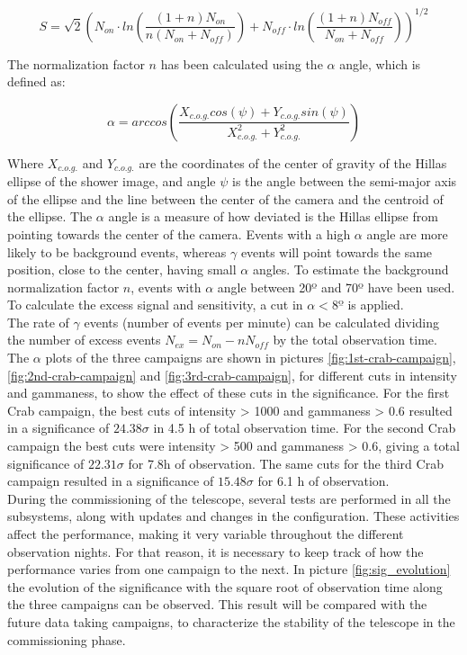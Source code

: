 \documentclass[main.tex]{subfiles}
\begin{document}
\begin{equation}
  S = \sqrt{2} \left(N_{on}\cdot ln\left( \frac{(1+n)N_{on}}{n(N_{on}+N_{off})}\right)+N_{off}\cdot ln\left( \frac{(1+n)N_{off}}{N_{on}+N_{off}}\right) \right)^{1/2}
\end{equation}

The normalization factor $n$ has been calculated using the $\alpha$ angle, which is defined as:

\begin{equation}
  \alpha = arc cos\left(\frac{X_{c.o.g.}cos(\psi) + Y_{c.o.g.} sin(\psi)}{X_{c.o.g.}^2 + Y_{c.o.g.}^2}\right)
\end{equation}

Where $X_{c.o.g.}$ and $Y_{c.o.g.}$ are the coordinates of the center of gravity of the Hillas ellipse of the shower image, and angle $\psi$ is the angle between the semi-major axis of the ellipse and the line between the center of the camera and the centroid of the ellipse. The $\alpha$ angle is a measure of how deviated is the Hillas ellipse from pointing towards the center of the camera. Events with a high $\alpha$ angle are more likely to be background events, whereas $\gamma$ events will point towards the same position, close to the center, having small $\alpha$ angles. To estimate the background normalization factor $n$, events with $\alpha$ angle between 20º and 70º have been used. To calculate the excess signal and sensitivity, a cut in $\alpha < 8º$ is applied.\\
The rate of $\gamma$ events (number of events per minute) can be calculated dividing the number of excess events $N_{ex}=N_{on}-n N_{off}$ by the total observation time.\\
The $\alpha$ plots of the three campaigns are shown in pictures \ref{fig:1st-crab-campaign}, \ref{fig:2nd-crab-campaign} and \ref{fig:3rd-crab-campaign}, for different cuts in intensity and gammaness, to show the effect of these cuts in the significance. For the first Crab campaign, the best cuts of intensity > 1000 and gammaness > 0.6 resulted in a significance of $24.38 \sigma$ in 4.5 h of total observation time. For the second Crab campaign the best cuts were intensity > 500 and gammaness > 0.6, giving a total significance of $22.31\sigma$ for 7.8h of observation. The same cuts for the third Crab campaign resulted in a significance of $15.48\sigma$ for 6.1 h of observation.\\
During the commissioning of the telescope, several tests are performed in all the subsystems, along with updates and changes in the configuration. These activities affect the performance, making it very variable throughout the different observation nights. For that reason, it is necessary to keep track of how the performance varies from one campaign to the next. In picture \ref{fig:sig_evolution} the evolution of the significance with the square root of observation time along the three campaigns can be observed. This result will be compared with the future data taking campaigns, to characterize the stability of the telescope in the commissioning phase.
\end{document}
